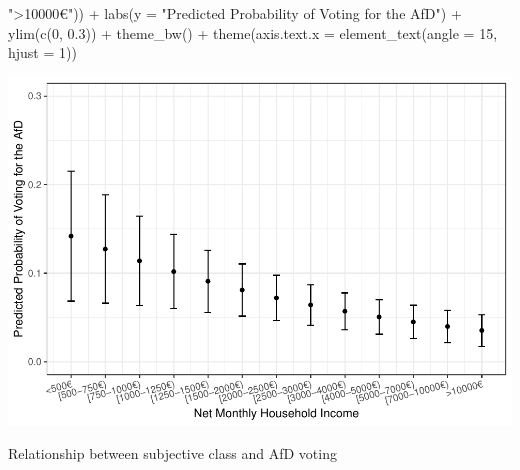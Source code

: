 \documentclass[
]{article}
\newenvironment{Shaded}{\begin{snugshade}}{\end{snugshade}}
\newcommand{\AttributeTok}[1]{\textcolor[rgb]{0.77,0.63,0.00}{#1}}
\newcommand{\DecValTok}[1]{\textcolor[rgb]{0.00,0.00,0.81}{#1}}
\newcommand{\FloatTok}[1]{\textcolor[rgb]{0.00,0.00,0.81}{#1}}
\newcommand{\FunctionTok}[1]{\textcolor[rgb]{0.00,0.00,0.00}{#1}}
\newcommand{\NormalTok}[1]{#1}
\newcommand{\SpecialCharTok}[1]{\textcolor[rgb]{0.00,0.00,0.00}{#1}}
\newcommand{\StringTok}[1]{\textcolor[rgb]{0.31,0.60,0.02}{#1}}
\begin{document}
\begin{Shaded}
\begin{Highlighting}[]
                                \StringTok{"\textgreater{}10000€"}\NormalTok{)) }\SpecialCharTok{+}
  \FunctionTok{labs}\NormalTok{(}\AttributeTok{y =} \StringTok{"Predicted Probability of Voting for the AfD"}\NormalTok{) }\SpecialCharTok{+}
  \FunctionTok{ylim}\NormalTok{(}\FunctionTok{c}\NormalTok{(}\DecValTok{0}\NormalTok{, }\FloatTok{0.3}\NormalTok{)) }\SpecialCharTok{+}
  \FunctionTok{theme\_bw}\NormalTok{() }\SpecialCharTok{+}
  \FunctionTok{theme}\NormalTok{(}\AttributeTok{axis.text.x =} \FunctionTok{element\_text}\NormalTok{(}\AttributeTok{angle =} \DecValTok{15}\NormalTok{, }\AttributeTok{hjust =} \DecValTok{1}\NormalTok{))}
\end{Highlighting}
\end{Shaded}

\includegraphics{AVCD_Final_Assignment-Edenhofer_latest_files/figure-latex/afd-household-income-1.pdf}

Relationship between subjective class and AfD voting
\end{document}
